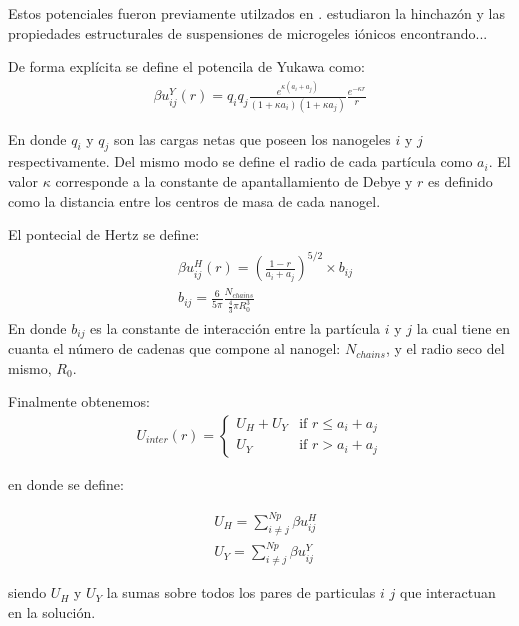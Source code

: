 	
	
	Estos potenciales fueron previamente utilzados en \cite{weyer2018concentration}. \citet{weyer2018concentration} estudiaron la hinchaz\'on y las propiedades estructurales de suspensiones de microgeles i\'onicos encontrando...
	
	De forma expl\'icita se define el potencila de Yukawa como: 
	\begin{align}
		\beta u^Y_{ij}(r) = q_i q_j \frac{e^{\kappa(a_i + a_j)}}{(1 +\kappa a_i)(1 + \kappa a_j)} \frac{e^{-\kappa r}}{r} 
		\label{eq:mc:yukawa}
	\end{align}
	
	\noindent En donde $q_i$ y $q_j$ son las cargas netas que poseen los nanogeles $i$ y $j$ respectivamente. Del mismo modo se define el radio de cada part\'icula como $a_i$. El valor $\kappa$ corresponde a la constante de apantallamiento de Debye y $r$ es definido como la distancia entre los centros de masa de cada nanogel.
	
	El pontecial de Hertz  se define:
	\begin{align}
		\begin{aligned}
			& \beta u^H_{ij} (r) = \left(\frac{1-r}{a_i + a_j}\right)^{5/2}\times b_{ij} \\
			& b_{ij} = \frac{6}{5\pi}\frac{N_{chains}}{\frac{4}{3}\pi R_0^3}
		\end{aligned}
	\end{align}
	\noindent En donde $b_{ij}$ es la constante de interacci\'on entre la part\'icula $i$ y $j$ la cual tiene en cuanta el n\'umero de cadenas que compone al nanogel: $N_{chains}$, y el radio seco del mismo, $R_0$.
	
	Finalmente obtenemos:
	\begin{align}
		U_{inter}(r) = \begin{cases} U_H + U_Y & \text{if } r \leq a_i + a_j \\ U_Y & \text{if } r > a_i + a_j \end{cases} 
		\label{eq:mc:HY-potential}
	\end{align}
	
	\noindent en donde se define:
	
	\begin{align}
		& U_H = \sum^{Np}_{i \neq j} \beta u^H_{ij} \\
		& U_Y = \sum^{Np}_{i \neq j} \beta u^Y_{ij}
	\end{align}
	
	\noindent siendo $U_H$ y $U_Y$ la sumas sobre todos los pares de particulas $i$ $j$ que interactuan en la soluci\'on.
	
